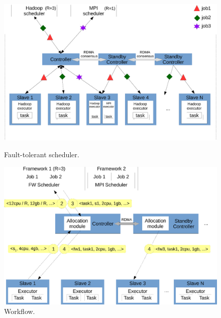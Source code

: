 \begin{figure}[!htb]
    \begin{minipage}{.49\textwidth}
        \vspace{-.2in}
        \includegraphics[width=0.34\textheight]{figures/scheduler_arch.eps}
        \vspace{-.3in}
        \caption{Fault-tolerant scheduler.}
        \label{fig:scheduler-arch}
    \end{minipage}
    \begin{minipage}{0.51\textwidth}
        \vspace{-.2in}
        \includegraphics[width=0.34\textheight]{figures/scheduler_flow.eps}
        \vspace{-.3in}
        \caption{Workflow.}
        \label{fig:scheduler-workflow}
    \end{minipage}
\end{figure}

